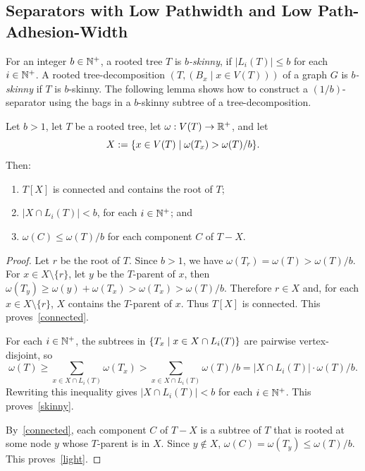 \documentclass{patmorin}
\renewcommand{\ge}{\geqslant}
\renewcommand{\le}{\leqslant}
\newcommand{\defin}[1]{\emph{\textcolor{brightmaroon}{#1}}}
\DeclarePairedDelimiter{\set}{\{}{\}}
\begin{document}
  \subsection{Separators with Low Pathwidth and Low Path-Adhesion-Width}

  For an integer $b\in\mathbb{N}^+$, 
  a rooted tree $T$ is \defin{$b$-skinny}, 
  if $|L_i(T)|\le b$ for each $i\in\mathbb{N}^+$.  A rooted tree-decomposition $(T,(B_x\mid x\in V(T)))$ of a graph $G$ is \defin{$b$-skinny} if $T$ is $b$-skinny.  The following lemma shows how to construct a $(1/b)$-separator using the bags in a $b$-skinny subtree of a tree-decomposition.


  \begin{lem}\label{low_pathwidth_separator}
    Let $b>1$, let $T$ be a rooted tree, let $\omega:V(T)\to\mathbb{R}^+$, and let
    \[
    X:=\set{x\in V(T)\mid\omega(T_x)>\omega(T)/b}.
    \]
    Then:
    \begin{enumerate}[nosep,nolistsep,label=(\alph*)]
      \item\label{connected} $T[X]$ is connected and contains the root of $T$;
      \item\label{skinny} $|X\cap L_i(T)|< b$, for each $i\in\mathbb{N}^+$; and
      \item\label{light} $\omega(C)\le \omega(T)/b$ for each component $C$ of $T-X$.
    \end{enumerate}
  \end{lem}

  \begin{proof}
    Let $r$ be the root of $T$.  Since $b>1$, we have $\omega(T_r)=\omega(T)>\omega(T)/b$. %
    For $x\in X\setminus\{r\}$, let $y$ be the $T$-parent of $x$, then 
    $\omega(T_y)\ge \omega(y)+\omega(T_x)>\omega(T_x)>\omega(T)/b$. 
    Therefore $r\in X$ and, for each $x\in X\setminus\{r\}$, $X$ contains the $T$-parent of $x$. Thus $T[X]$ is connected.
    This proves~\ref{connected}.
    
    For each $i\in\mathbb{N}^+$, the subtrees in $\set{T_x \mid x\in X\cap L_i(T)}$ are pairwise vertex-disjoint, so 
    \[
    \omega(T) \ge \sum_{x\in X\cap L_i(T)} \omega(T_x)> \sum_{x\in X\cap L_i(T)}\omega(T)/b = |X\cap L_i(T)|\cdot\omega(T)/b.
    \]
    Rewriting this inequality gives $|X\cap L_i(T)|<b$ for each $i\in\mathbb{N}^+$.
    This proves~\ref{skinny}.
    
    By~\ref{connected}, each component $C$ of $T-X$ is a subtree of $T$ that is rooted at some node $y$ whose $T$-parent is in $X$.  Since  $y\not\in X$, $\omega(C)=\omega(T_y)\le \omega(T)/b$.
    This proves~\ref{light}. 
  \end{proof}
\end{document}
